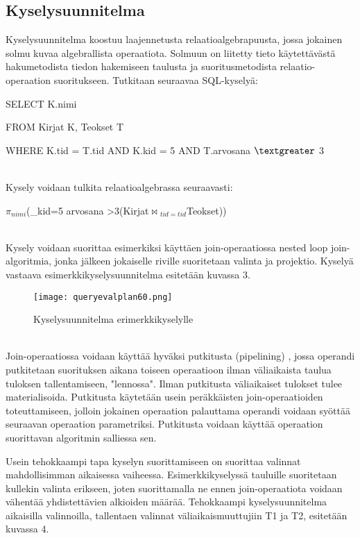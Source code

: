 \documentclass[finnish]{tktltiki2}
\theoremstyle{definition}
\theoremstyle{remark}
\begin{document}
\subsection{Kyselysuunnitelma}
Kyselysuunnitelma koostuu laajennetusta relaatioalgebrapuusta, jossa jokainen solmu kuvaa algebrallista operaatiota. Solmuun on liitetty tieto käytettävästä hakumetodista tiedon hakemiseen taulusta ja suoritusmetodista relaatio-operaation suoritukseen. Tutkitaan seuraavaa SQL-kyselyä:

\begin{frame}

SELECT K.nimi

FROM Kirjat K, Teokset T

WHERE K.tid = T.tid AND K.kid = 5 AND T.arvosana $\textgreater$  3
\end{frame}
\\\newline
Kysely voidaan tulkita relaatioalgebrassa seuraavasti:

\begin{frame}

$\pi$$_{nimi}$(\sigma_{kid=5 \wedge arvosana \textgreater 3}(Kirjat$\Join$$ _{tid=tid}$Teokset))
\end{frame}
\\\newline
Kysely voidaan suorittaa esimerkiksi käyttäen join-operaatiossa nested loop join-algoritmia, jonka jälkeen jokaiselle riville suoritetaan 
valinta ja projektio. Kyselyä vastaava esimerkkikyselysuunnitelma esitetään kuvassa 3.

\begin{figure}[!h] 
  \caption{Kyselysuunnitelma erimerkkikyselylle}
  \centering
    \texttt{[image: queryevalplan60.png]}
\end{figure}
\\\newline
Join-operaatiossa voidaan käyttää hyväksi putkitusta (pipelining) \cite{dalvi2001pipelining}, jossa operandi putkitetaan suorituksen aikana toiseen operaatioon ilman väliaikaista taulua tuloksen tallentamiseen, "lennossa". Ilman putkitusta väliaikaiset tulokset tulee materialisoida. Putkitusta käytetään usein peräkkäisten join-operaatioiden toteuttamiseen, jolloin jokainen operaation palauttama operandi voidaan syöttää seuraavan operaation parametriksi. Putkitusta voidaan käyttää operaation suorittavan algoritmin salliessa sen.

Usein tehokkaampi tapa kyselyn suorittamiseen on suorittaa valinnat mahdollisimman aikaisessa vaiheessa. \cite{ramakrishnan2003database} Esimerkkikyselyssä tauluille suoritetaan kullekin valinta erikseen, joten suorittamalla ne ennen join-operaatiota voidaan vähentää yhdistettävien alkioiden määrää. Tehokkaampi kyselysuunnitelma aikaisilla valinnoilla, tallentaen valinnat väliaikaismuuttujiin T1 ja T2, esitetään kuvassa 4.
\end{document}
